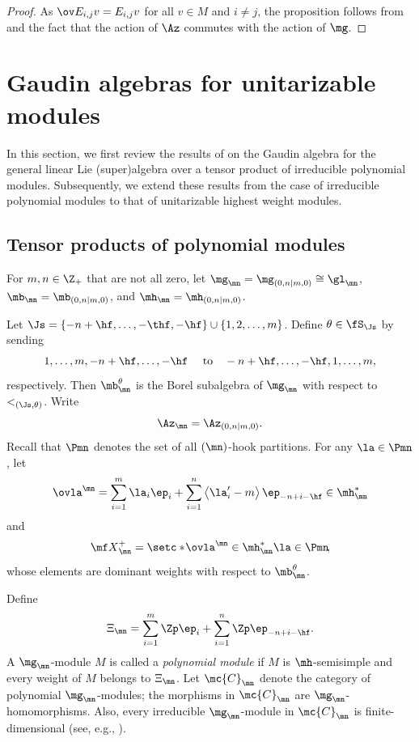 \documentclass[11pt, reqno]{amsart}
\theoremstyle{definition}
\theoremstyle{remark}
\numberwithin{equation}{section}
\begin{document}
\begin{proof}
As $\ov E_{i,j}v=E_{i,j}v$ for all $v\in M$ and $i\not=j$, the proposition follows from  and the fact that the action of $\Az$ commutes with the action of $\mg$.
\end{proof}



\section{Gaudin algebras for unitarizable modules} \label{Gaudin-Uni}

In this section, we first review the results of \cite{ChL25} on the Gaudin algebra for the general linear Lie (super)algebra over a tensor product of irreducible polynomial modules.
Subsequently, we extend these results from the case of irreducible polynomial modules to that of unitarizable highest weight modules.

\subsection{Tensor products of polynomial modules} \label{poly}
For $m, n \in \Z_+$ that are not all zero, let $\mg_\mn=\mg_{(0,n|m,0)} \cong \gl_\mn$, $\mb_\mn=\mb_{(0,n|m,0)}$, and $\mh_\mn=\mh_{(0,n|m,0)}$.

Let $\Js=\{-n+\hf, \ldots, -\thf, -\hf \} \cup \{ 1, 2, \ldots, m \}$.
Define $\theta \in \fS_\Js$ by sending
$$
  1, \ldots, m, -n+\hf, \ldots, -\hf \quad \mbox{ to}\quad -n+\hf, \ldots, -\hf, 1, \ldots, m,
$$
   respectively.
Then $\mb_\mn^\theta$ is the Borel subalgebra of $\mg_\mn$ with respect to $<_{(\Js, \theta)}$.
Write
$$
\Az_\mn=\Az_{(0,n|m,0)}.
$$
Recall that $\Pmn$ denotes the set of all $(\mn)$-hook partitions.
For any $\la \in \Pmn$,
let
$$
\ovla^\mn=\sum_{i=1}^{m}\la_i\ep_i+\sum_{i=1}^{n} \left\langle \la_i^\prime-m \right\rangle\ep_{-n+i-\hf}  \in \mh_\mn^{*}
$$
and
\begin{equation} \label{weight-neg}
{\mf X}^+_\mn=\setc*{\! \ovla^\mn \in \mh_\mn^{*}}{\la \in \Pmn \!},
\end{equation}
whose elements are dominant weights with respect to $\mb_\mn^\theta$.

Define
$$
\Xi_\mn=\sum_{i=1}^{m} \Zp \ep_i+\sum_{i=1}^{n} \Zp \ep_{-n+i-\hf}.
$$
A $\mg_\mn$-module $M$ is called a \emph{polynomial module} if $M$ is $\mh$-semisimple and every weight of $M$ belongs to $\Xi_\mn$.
%
Let $\mc{C}_\mn$ denote the category of polynomial $\mg_\mn$-modules; the morphisms in $\mc{C}_\mn$ are $\mg_\mn$-homomorphisms.
Also, every irreducible $\mg_\mn$-module in $\mc{C}_\mn$ is finite-dimensional (see, e.g., \cite[Proposition 2.2]{CW}).
\end{document}
